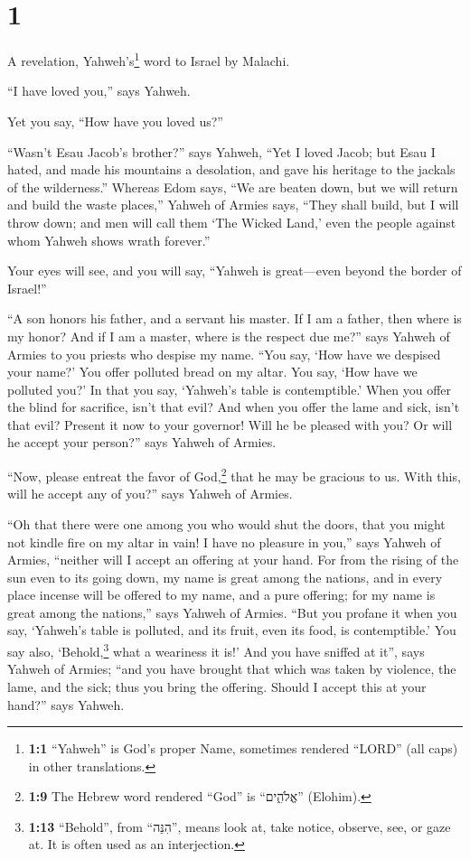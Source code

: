 \hypertarget{section}{%
\section{1}\label{section}}

 A revelation, Yahweh's\footnote{\textbf{1:1} ``Yahweh''
  is God's proper Name, sometimes rendered ``LORD'' (all caps) in other
  translations.} word to Israel by Malachi.

 ``I have loved you,'' says Yahweh.

Yet you say, ``How have you loved us?''

``Wasn't Esau Jacob's brother?'' says Yahweh, ``Yet I loved Jacob;
 but Esau I hated, and made his mountains a desolation,
and gave his heritage to the jackals of the wilderness.'' 
Whereas Edom says, ``We are beaten down, but we will return and build
the waste places,'' Yahweh of Armies says, ``They shall build, but I
will throw down; and men will call them `The Wicked Land,' even the
people against whom Yahweh shows wrath forever.''

 Your eyes will see, and you will say, ``Yahweh is
great---even beyond the border of Israel!''

 ``A son honors his father, and a servant his master. If I
am a father, then where is my honor? And if I am a master, where is the
respect due me?'' says Yahweh of Armies to you priests who despise my
name. ``You say, `How have we despised your name?'  You
offer polluted bread on my altar. You say, `How have we polluted you?'
In that you say, `Yahweh's table is contemptible.'  When
you offer the blind for sacrifice, isn't that evil? And when you offer
the lame and sick, isn't that evil? Present it now to your governor!
Will he be pleased with you? Or will he accept your person?'' says
Yahweh of Armies.

 ``Now, please entreat the favor of God,\footnote{\textbf{1:9}
  The Hebrew word rendered ``God'' is ``אֱלֹהִ֑ים'' (Elohim).} that he
may be gracious to us. With this, will he accept any of you?'' says
Yahweh of Armies.

 ``Oh that there were one among you who would shut the
doors, that you might not kindle fire on my altar in vain! I have no
pleasure in you,'' says Yahweh of Armies, ``neither will I accept an
offering at your hand.  For from the rising of the sun
even to its going down, my name is great among the nations, and in every
place incense will be offered to my name, and a pure offering; for my
name is great among the nations,'' says Yahweh of Armies.
 ``But you profane it when you say, `Yahweh's table is
polluted, and its fruit, even its food, is contemptible.'
 You say also, `Behold,\footnote{\textbf{1:13}
  ``Behold'', from ``הִנֵּה'', means look at, take notice, observe, see,
  or gaze at. It is often used as an interjection.} what a weariness it
is!' And you have sniffed at it'', says Yahweh of Armies; ``and you have
brought that which was taken by violence, the lame, and the sick; thus
you bring the offering. Should I accept this at your hand?'' says
Yahweh.

